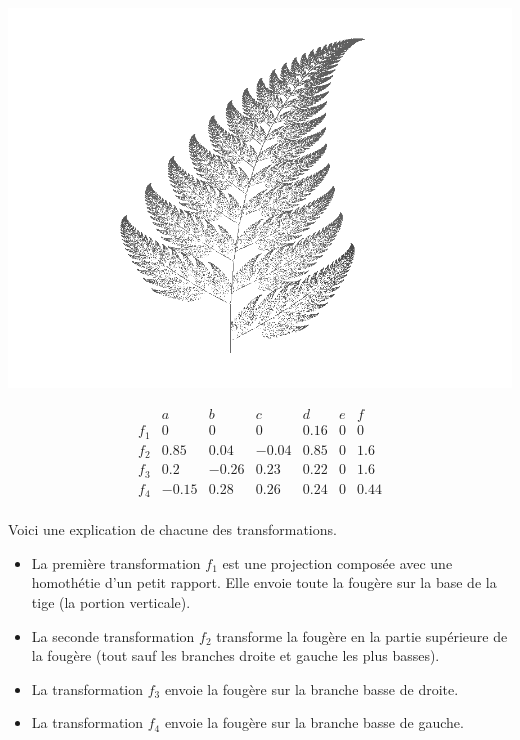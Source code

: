 \documentclass[11pt,class=report,crop=false]{standalone}
\begin{document}
\begin{center}
 \includegraphics[scale=.5]{images/IFS-fern1.png}
\end{center}
\begin{displaymath}
\begin{array}{c|cccccc}
     & a & b & c & d & e & f \\
\hline
f_1 & 0 & 0 & 0 & 0.16 & 0 & 0 \\
\hline
f_2  & 0.85 &0.04&-0.04&0.85&0&1.6 \\
\hline
f_3 & 0.2 & -0.26 & 0.23 & 0.22 & 0 & 1.6 \\
\hline
f_4  & -0.15 & 0.28 & 0.26 & 0.24 & 0 & 0.44 \\
\end{array}
\end{displaymath}

\bigskip

Voici une explication de chacune des transformations. 
\begin{itemize}
  \item La première transformation $f_1$ est une projection composée avec une homothétie d'un petit rapport. Elle envoie toute la fougère sur la base de la tige (la portion verticale).
  \item La seconde transformation $f_2$ transforme la fougère en la partie supérieure de la fougère (tout sauf les branches droite et gauche les plus basses).
  \item La transformation $f_3$ envoie la fougère sur la branche basse de droite.
  \item La transformation $f_4$ envoie la fougère sur la branche basse de gauche.  
\end{itemize}
\end{document}
